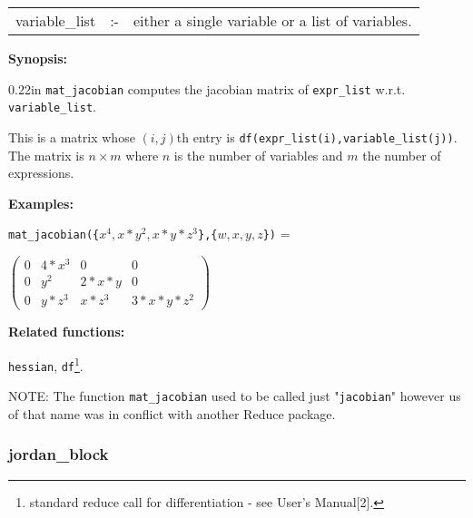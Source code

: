 \vspace*{0.04in}
\hspace*{0.1in}
\begin{tabular}{l l l}
variable\_list &:-& either a single variable or a list of variables.
\end{tabular}

{\bf Synopsis:} %

\begin{addtolength}{\leftskip}{0.22in}
{\tt mat\_jacobian} computes the jacobian matrix of \texttt{expr\_list} w.r.t. 
\texttt{variable\_list}. 

This is a matrix whose $(i,j)$th entry
is \texttt{df(expr\_list(i),variable\_list(j))}.  The matrix is $n\times m$
where $n$ is the number of variables and $m$ the number of expressions.

\end{addtolength}

{\bf Examples:}

\hspace*{0.175in} 
{\tt mat\_jacobian(\{$x^4,x*y^2,x*y*z^3$\},\{$w,x,y,z$\})} = 

\vspace*{0.1in}

\begin{flushleft}  
\hspace*{0.175in}
\begin{math}        
\left( \begin{array}{cccc} 0 & 4*x^3 & 0 & 0 \\ 0 & y^2 & 2*x*y & 0 \\ 
0 & y*z^3 & x*z^3 & 3*x*y*z^2 
\end{array} \right)
\end{math}  
\end{flushleft}

{\bf Related functions:}

\hspace*{0.175in} {\tt hessian}, {\tt df}\footnote{standard reduce call 
for differentiation - see {\REDUCE} User's Manual[2].}.

NOTE: The function \texttt{mat\_jacobian} used to be called just "\texttt{jacobian}"
however us of that name was in conflict with another Reduce package.


\subsubsection{jordan\_block}
\label{linalg:jordan_block}

